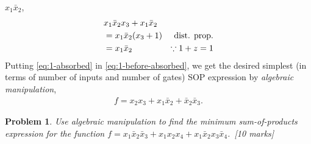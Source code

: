 \documentclass[twocolumn]{article}
\newtheorem{prob}{Problem}
\newcommand{\bx}{\bar{x}}
\begin{document}
$x_1 \bx_2$,
%
\begin{align}
  &x_1 \bx_2 x_3 + x_1 \bx_2
    \notag\\
  &= x_1 \bx_2 ( x_3 +  1) & \text{dist. prop.}
    \notag\\
  &= x_1 \bx_2  & \because 1 + z = 1
                  \label{eq:1-absorbed}
\end{align}
%
Putting \eqref{eq:1-absorbed} in \eqref{eq:1-before-absorbed}, we get the
desired simplest (in terms of number of inputs and number of gates) SOP expression by \emph{algebraic manipulation},
%
\begin{align}
  f = x_2 x_3 +  x_1 \bx_2 + \bx_2\bx_3.
\end{align}

\begin{prob}
Use algebraic manipulation to find the minimum sum-of-products expression for the function $f = x_1\bx_2\bx_3 + x_1x_2x_4 + x_1\bx_2 x_3\bx_4$.~\cite[Prob 2.13]{brown2013fundamentals}[10 marks]
\end{prob}
\end{document}
